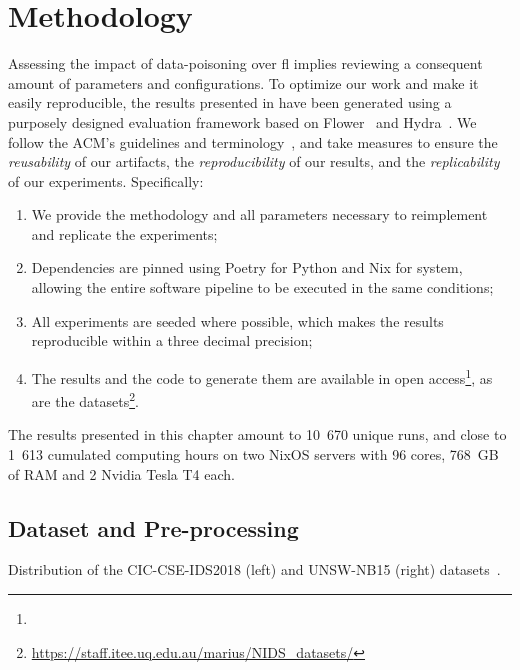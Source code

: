\section{Methodology\label{sec:assess.method}}

Assessing the impact of data-poisoning over \gls{fl} implies reviewing a consequent amount of parameters and configurations.
To optimize our work and make it easily reproducible, the results presented in  have been generated using a purposely designed evaluation framework based on Flower~\cite{beutel_Flowerfriendlyfederated_2020} and Hydra~\cite{Hydra}.
We follow the ACM's guidelines and terminology~\cite{ACM_artifacts}, and take measures to ensure the \emph{reusability} of our artifacts, the \emph{reproducibility} of our results, and the \emph{replicability} of our experiments.
Specifically:
\begin{enumerate}[1.]
    \item We provide the methodology and all parameters necessary to reimplement and replicate the experiments;
    \item Dependencies are pinned using Poetry for Python and Nix for system, allowing the entire software pipeline to be executed in the same conditions;
    \item All experiments are seeded where possible, which makes the results reproducible within a three decimal precision;
    \item The results and the code to generate them are available in open access\footnote{\codeurl}, as are the datasets\footnote{\url{https://staff.itee.uq.edu.au/marius/NIDS_datasets/}}.
\end{enumerate}

The results presented in this chapter amount to 10~670 unique runs, and close to 1~613 cumulated computing hours on two NixOS servers with 96 cores, 768~GB of RAM and 2 Nvidia Tesla T4 each. 



\subsection{Dataset and Pre-processing\label{sec:assess.method.dataset}}



\begin{table}
  \centering
  \caption{
    Distribution of the CIC-CSE-IDS2018 (left) and UNSW-NB15 (right) datasets~\cite{sarhan_StandardFeatureSet_2022,layeghy_GeneralisabilityMachineLearningbased_2022}.
    \label{tbl:assess.datasets}
  }
  
\end{table}

